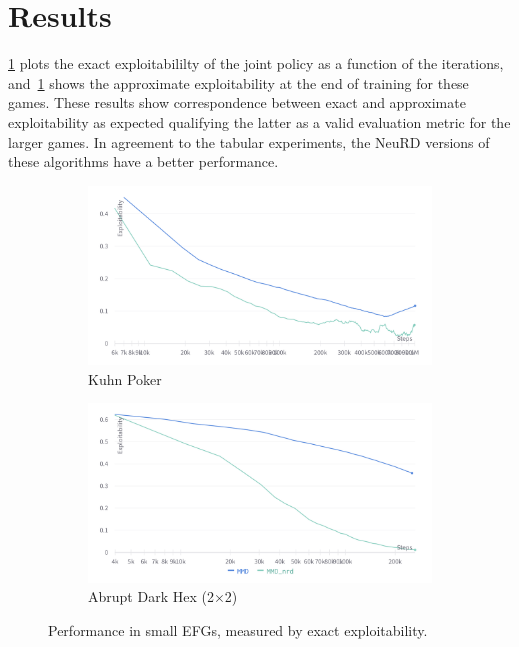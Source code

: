 \section{Results}
\ref{fig:neuralsmall1} plots the exact exploitabililty of the joint policy as a function of the
iterations, and~\ref{fig:neuralsmall1} shows the approximate exploitability at the end of training for these games.
These results show correspondence between exact and approximate exploitability as expected
qualifying the latter as a valid evaluation metric for the larger games.
In agreement to the tabular experiments, the NeuRD versions of these algorithms have a better
performance.

\begin{figure}[H]
	\centering
	\begin{subfigure}[b]{0.6\textwidth}
		\includegraphics[width=\textwidth]{figs/kpoker.png}
		\caption{Kuhn Poker}
	\end{subfigure}
	\begin{subfigure}[b]{0.6\textwidth}
		\includegraphics[width=\textwidth]{figs/ahex22.png}
		\caption{Abrupt Dark Hex (2$\times$2)}
	\end{subfigure}
	\caption{Performance in small EFGs, measured by exact exploitability.}
	\label{fig:neuralsmall1}
\end{figure}

